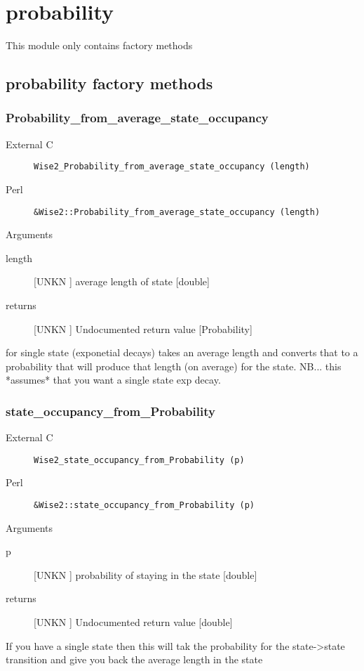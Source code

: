 \section{probability}
\label{module_probability}
This module only contains factory methods

\subsection{probability factory methods}
\subsubsection{Probability_from_average_state_occupancy}
\begin{description}
\item[External C] {\tt Wise2_Probability_from_average_state_occupancy (length)}
\item[Perl] {\tt &Wise2::Probability_from_average_state_occupancy (length)}

\end{description}
Arguments
\begin{description}
\item[length] [UNKN ] average length of state [double]
\item[returns] [UNKN ] Undocumented return value [Probability]
\end{description}
for single state (exponetial decays) takes an average length
and converts that to a probability that will produce that
length (on average) for the state. NB... this *assumes* that
you want a single state exp decay.


\subsubsection{state_occupancy_from_Probability}
\begin{description}
\item[External C] {\tt Wise2_state_occupancy_from_Probability (p)}
\item[Perl] {\tt &Wise2::state_occupancy_from_Probability (p)}

\end{description}
Arguments
\begin{description}
\item[p] [UNKN ] probability of staying in the state [double]
\item[returns] [UNKN ] Undocumented return value [double]
\end{description}
If you have a single state then this will tak
the probability for the state->state transition and
give you back the average length in the state



